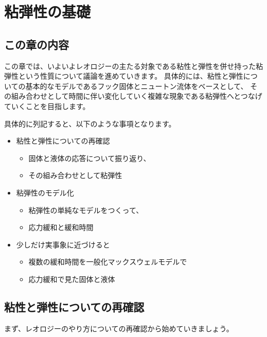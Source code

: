 \documentclass[uplatex,dvipdfmx,a4paper,11pt]{jsreport}
\begin{document}
\setcounter{chapter}{5}
\chapter{粘弾性の基礎}

\section*{この章の内容}

この章では、いよいよレオロジーの主たる対象である粘性と弾性を併せ持った粘弾性という性質について議論を進めていきます。
具体的には、粘性と弾性についての基本的なモデルであるフック固体とニュートン流体をベースとして、
その組み合わせとして時間に伴い変化していく複雑な現象である粘弾性へとつなげていくことを⽬指します。

具体的に列記すると、以下のような事項となります。
\begin{boxnote}
    \begin{itemize}
        \item 粘性と弾性についての再確認
            \begin{itemize}
                \item 固体と液体の応答について振り返り、
                \item その組み合わせとして粘弾性
            \end{itemize} 
        \item 粘弾性のモデル化
            \begin{itemize}
                \item 粘弾性の単純なモデルをつくって、
                \item 応力緩和と緩和時間
            \end{itemize} 
        \item 少しだけ実事象に近づけると
            \begin{itemize}
                \item 複数の緩和時間を一般化マックスウェルモデルで
                \item 応力緩和で見た固体と液体
            \end{itemize}
    \end{itemize}
\end{boxnote}


\section{粘性と弾性についての再確認}
まず、レオロジーのやり方についての再確認から始めていきましょう。
\end{document}
